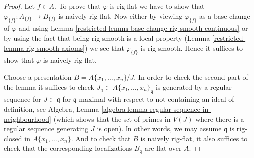 \begin{proof}

Let $f \in A$. To prove that $\varphi$ is rig-flat we have to show
that $\varphi_{\{f\}} : A_{\{f\}} \to B_{\{f\}}$ is naively rig-flat.
Now either by viewing $\varphi_{\{f\}}$ as a base change of $\varphi$
and using Lemma \ref{restricted-lemma-base-change-rig-smooth-continuous}
or by using the fact that being rig-smooth
is a local property (Lemma \ref{restricted-lemma-rig-smooth-axioms}) we see that
$\varphi_{\{f\}}$ is rig-smooth. Hence it suffices to show
that $\varphi$ is naively rig-flat.

\medskip\noindent
Choose a presentation $B = A\{x_1, \ldots, x_n\}/J$.
In order to check the second part of the lemma it suffices
to check $J_\mathfrak q \subset A\{x_1, \ldots, x_n\}_\mathfrak q$
is generated by a regular sequence for $J \subset \mathfrak q$
for $\mathfrak q$ maximal with respect to not containing
an ideal of definition, see
Algebra, Lemma \ref{algebra-lemma-regular-sequence-in-neighbourhood}
(which shows that the set of primes in $V(J)$ where there is
a regular sequence generating $J$ is open).
In other words, we may assume $\mathfrak q$ is rig-closed
in $A\{x_1, \ldots, x_n\}$. And to check that
$B$ is naively rig-flat, it also suffices to
check that the corresponding localizations $B_\mathfrak q$
are flat over $A$.


\end{proof}
